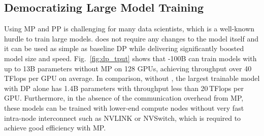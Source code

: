 
\subsection{Democratizing Large Model Training}
Using MP and PP is challenging for many data scientists, which is a well-known hurdle to train large models.  \name does not require any changes to the model itself and it can be used as simple as baseline DP while delivering significantly boosted model size and speed.  Fig.~\ref{fig:dp_tput} shows that \name-100B can train models with up to 13B parameters without MP on 128 GPUs, achieving throughput over 40\,TFlops per GPU on average. In comparison, without \name, the largest trainable model with DP alone has 1.4B parameters with throughput less than 20\,TFlops per GPU. 
Furthermore, in the absence of the communication overhead from MP, these models can be trained with lower-end compute nodes without very fast intra-node interconnect such as NVLINK or NVSwitch, which is required to achieve good efficiency with MP.  

